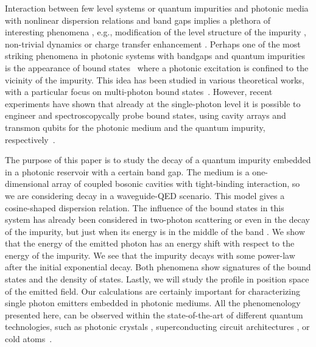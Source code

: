 \documentclass[aps,pra,twocolumn,floatfix,superscriptaddress]{revtex4-1}%
\begin{document}
Interaction between few level systems or quantum impurities and photonic media with nonlinear dispersion relations and band gaps implies a plethora of interesting phenomena \cite{Lambropoulos2000}, e.g., modification of the level structure of the impurity \cite{John1990,John1991,Ripoll2015}, non-trivial dynamics \cite{John1994,Gaveau1995,Redchenko2014} or charge transfer enhancement \cite{Tanaka2006}. %
Perhaps one of the most striking phenomena in photonic systems with bandgaps and quantum impurities is the appearance of bound states\ \cite{John1984,John1987} where a photonic excitation is confined to the vicinity of the impurity. This idea has been studied in various theoretical works, with a particular focus on multi-photon bound states\ \cite{Rabl2015,Cirac2015}. However, recent experiments have shown that already at the single-photon level it is possible to engineer and spectroscopycally probe bound states, using cavity arrays and transmon qubits for the photonic medium and the quantum impurity, respectively\ \cite{liu2016}.


The purpose of this paper is to study the decay of a quantum impurity embedded in a photonic reservoir with a certain band gap. The medium is a one-dimensional array of coupled bosonic cavities with tight-binding interaction, so we are considering decay in a waveguide-QED scenario. This model gives a cosine-shaped dispersion relation. The influence of the bound states in this system has already been considered in two-photon scattering \cite{Longo2010,Longo2011} or even in the decay of the impurity, but just when its energy is in the middle of the band \cite{Lombardo2014}. We show that the energy of the emitted photon has an energy shift with respect to the energy of the impurity. We see that the impurity decays with some power-law after the initial exponential decay. Both phenomena show signatures of the bound states and the density of states. Lastly, we will study the profile in position space of the emitted field.  
Our calculations are certainly important for  characterizing single photon emitters embedded in photonic mediums.
All the phenomenology presented here, can be observed 
 within the state-of-the-art of different quantum technologies, such as photonic crystals \cite{Arcari2014,Sollner2015,Lodahl2015}, superconducting circuit architectures \cite{liu2016,Astafiev2010,Hoi2011,Hoi2013,VanLoo2013,Hoi2013b}, or cold atoms\ \cite{goban2015,thompson2013}. 
\end{document}
